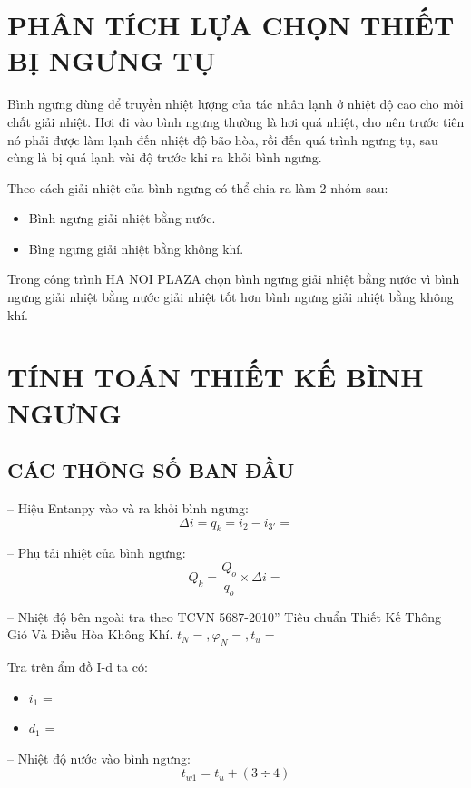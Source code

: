 \section{PHÂN TÍCH LỰA CHỌN THIẾT BỊ NGƯNG TỤ}
Bình ngưng dùng để truyền nhiệt lượng của tác nhân lạnh ở nhiệt độ cao cho môi chất giải nhiệt. Hơi đi vào bình ngưng thường là hơi quá nhiệt, cho nên trước tiên nó phải được làm lạnh đến nhiệt độ bão hòa, rồi đến quá trình ngưng tụ, sau cùng là bị quá lạnh vài độ trước khi ra khỏi bình ngưng.

Theo cách giải nhiệt của bình ngưng có thể chia ra làm 2 nhóm sau:
\begin{itemize}
	\item Bình ngưng giải nhiệt bằng nước.
	\item Bìng ngưng giải nhiệt bằng không khí.
\end{itemize}

Trong công trình HA NOI PLAZA chọn bình ngưng giải nhiệt bằng nước vì bình ngưng giải nhiệt bằng nước giải nhiệt tốt hơn bình ngưng giải nhiệt bằng không khí.
\section{TÍNH TOÁN THIẾT KẾ BÌNH NGƯNG}
\subsection{CÁC THÔNG SỐ BAN ĐẦU}
-- Hiệu Entanpy vào và ra khỏi bình ngưng:
\begin{equation*}
	\Delta i = q_{k} = i_{2} - i_{3'} = 
\end{equation*}

-- Phụ tải nhiệt của bình ngưng:
\begin{equation*}
	Q_{k} = \dfrac{Q_{o}}{q_{o}} \times \Delta i =  
\end{equation*}

-- Nhiệt độ bên ngoài tra theo TCVN 5687-2010” Tiêu chuẩn Thiết Kế Thông Gió Và Điều Hòa Không Khí.
$t_{N} = , \varphi_{N} = , t_{u} = $

Tra trên ẩm đồ I-d ta có:
\begin{itemize}
	\item $i_{1}$ =  
	\item $d_{1}$ = 
\end{itemize}

-- Nhiệt độ nước vào bình ngưng:
\begin{equation*}
	t_{w1} = t_{u} + (3\div 4)
\end{equation*}

